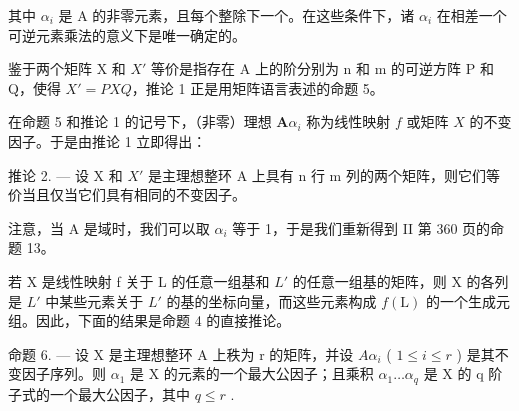 其中 \(\alpha_{i}\) 是 A 的非零元素，且每个整除下一个。在这些条件下，诸 \(\alpha_{i}\) 在相差一个可逆元素乘法的意义下是唯一确定的。

鉴于两个矩阵 X 和 \(X'\) 等价是指存在 A 上的阶分别为 n 和 m 的可逆方阵 P 和 Q，使得 \(X' = PXQ\)，推论 1 正是用矩阵语言表述的命题 5。

在命题 5 和推论 1 的记号下，（非零）理想 \(\mathbf{A}\alpha_{i}\) 称为线性映射 \(f\) 或矩阵 \(X\) 的不变因子。于是由推论 1 立即得出：

推论 2. --- 设 X 和 \(X'\) 是主理想整环 A 上具有 n 行 m 列的两个矩阵，则它们等价当且仅当它们具有相同的不变因子。

注意，当 A 是域时，我们可以取 \(\alpha_{i}\) 等于 1，于是我们重新得到 II 第 360 页的命题 13。

若 X 是线性映射 f 关于 L 的任意一组基和 \(L'\) 的任意一组基的矩阵，则 X 的各列是 \(L'\) 中某些元素关于 \(L'\) 的基的坐标向量，而这些元素构成 \(f(\mathrm{L})\) 的一个生成元组。因此，下面的结果是命题 4 的直接推论。

命题 6. --- 设 X 是主理想整环 A 上秩为 r 的矩阵，并设 \(A\alpha_{i}\) ( \(1 \leqslant i \leqslant r\) ) 是其不变因子序列。则 \(\alpha_{1}\) 是 X 的元素的一个最大公因子；且乘积 \(\alpha_{1} \ldots \alpha_{q}\) 是 X 的 q 阶子式的一个最大公因子，其中 \(q \leqslant r\) .

